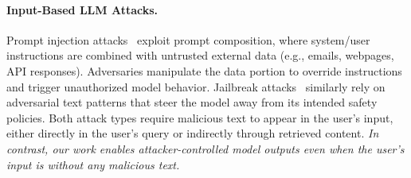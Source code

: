 \paragraph{Input-Based LLM Attacks.} Prompt injection attacks~\cite{perez2022ignore, greshake2023not, shi2024optimization, pasquini2024neural, liu2024formalizing, hui2024pleak, shao2025enhancing, wang2025webinject, labunets2025fun} exploit prompt composition, where system/user instructions are combined with untrusted external data (e.g., emails, webpages, API responses). Adversaries manipulate the data portion to override instructions and trigger unauthorized model behavior. Jailbreak attacks~\cite{zou2023universal, wei2023jailbroken, liu2024autodan, yang2024sneakyprompt, yang2024mma, chao2025jailbreaking} similarly rely on adversarial text patterns that steer the model away from its intended safety policies. Both attack types require malicious text to appear in the user's input, either directly in the user's query or indirectly through retrieved content. \textit{In contrast, our work enables attacker-controlled model outputs even when the user's input is without any malicious text.}

